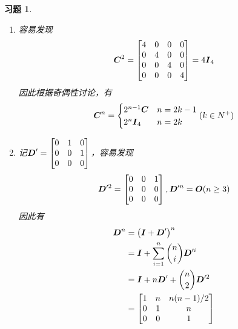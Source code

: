 \documentclass{ctexart}
\newtheorem{problem}{习题}[section]
\begin{document}
\begin{problem}\

\begin{enumerate}

    \item[(3)]
        {
        容易发现
        \begin{equation*}
            \boldsymbol{C}^2=
            \begin{bmatrix}
                4 & 0 & 0 & 0 \\
                0 & 4 & 0 & 0 \\
                0 & 0 & 4 & 0 \\
                0 & 0 & 0 & 4
            \end{bmatrix}=4\boldsymbol{I}_4
        \end{equation*}
        因此根据奇偶性讨论，有
        \begin{equation*}
            \boldsymbol{C}^n=
            \begin{cases}
                2^{n-1}\boldsymbol{C} & n=2k-1 \\
                2^n\boldsymbol{I}_4   & n=2k
            \end{cases}
            (k\in N^+)
        \end{equation*}
        }

    \item[(4)]
        {
        记\(\boldsymbol{D}'=\begin{bmatrix}0&1&0\\0&0&1\\0&0&0\end{bmatrix}\)，容易发现
        \begin{equation*}
            \boldsymbol{D}'^2=\begin{bmatrix}0&0&1\\0&0&0\\0&0&0\end{bmatrix},\boldsymbol{D}'^n=\boldsymbol{O}(n\ge3)
        \end{equation*}
        因此有
        \begin{align*}
            \boldsymbol{D}^n & =\left( \boldsymbol{I}+\boldsymbol{D}' \right)^n                 \\
                    & =\boldsymbol{I}+\sum_{i=1}^n\binom{n}{i}\boldsymbol{D}'^i \\
                    & =\boldsymbol{I}+n\boldsymbol{D}'+\binom{n}{2}\boldsymbol{D}'^2     \\
                    & =\begin{bmatrix}
                           1 & n & n(n-1)/2 \\
                           0 & 1 & n        \\
                           0 & 0 & 1
                       \end{bmatrix}
        \end{align*}
        }
\end{enumerate}
\end{problem}
\end{document}

